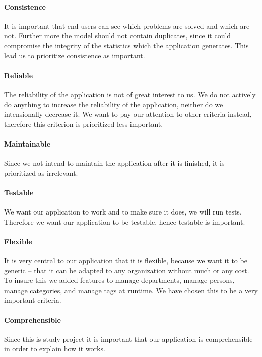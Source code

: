 \paragraph{Consistence}
It is important that end users can see which problems are solved and which are not.
Further more the \hdesk[] model should not contain duplicates, since it could compromise the integrity of the statistics which the application generates.
This lead us to prioritize consistence as important.
\paragraph{Reliable}
The reliability of the \hdesk[] application is not of great interest to us.
We do not actively do anything to increase the reliability of the application, neither do we intensionally decrease it.
We want to pay our attention to other criteria instead, therefore this criterion is prioritized less important.
\paragraph{Maintainable}
Since we not intend to maintain the application after it is finished, it is prioritized as irrelevant.
\paragraph{Testable}
We want our application to work and to make sure it does, we will run tests.
Therefore we want our application to be testable, hence testable is important. 
\paragraph{Flexible}
It is very central to our application that it is flexible, because we want it to be generic -- that it can be adapted to any organization without much or any cost. To insure this we added features to manage departments, manage persons, manage categories, and manage tags at runtime. We have chosen this to be a very important criteria.
\paragraph{Comprehensible}
Since this is study project it is important that our application is comprehensible in order to explain how it works. 
